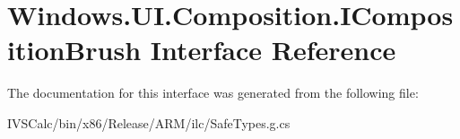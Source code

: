 \hypertarget{interface_windows_1_1_u_i_1_1_composition_1_1_i_composition_brush}{}\section{Windows.\+U\+I.\+Composition.\+I\+Composition\+Brush Interface Reference}
\label{interface_windows_1_1_u_i_1_1_composition_1_1_i_composition_brush}


The documentation for this interface was generated from the following file\+:\begin{DoxyCompactItemize}
\item 
I\+V\+S\+Calc/bin/x86/\+Release/\+A\+R\+M/ilc/Safe\+Types.\+g.\+cs\end{DoxyCompactItemize}
